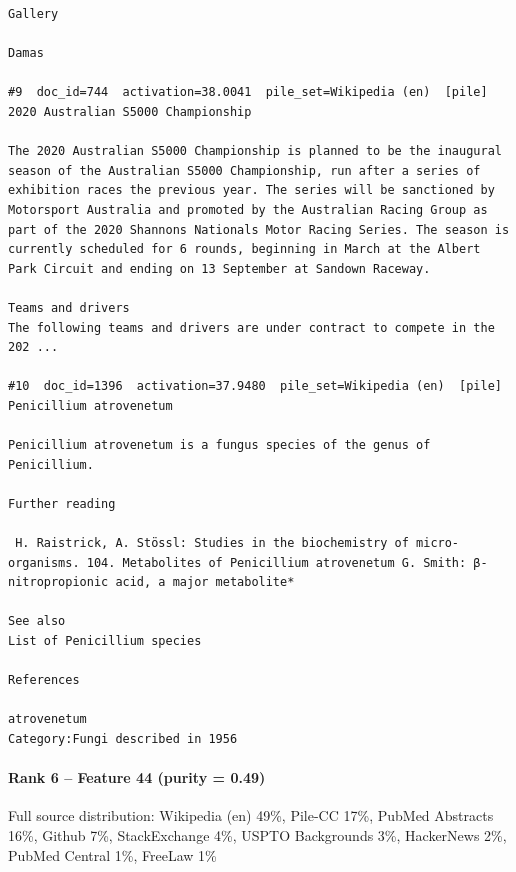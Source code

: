 \begin{verbatim}
Gallery

Damas

#9  doc_id=744  activation=38.0041  pile_set=Wikipedia (en)  [pile]
2020 Australian S5000 Championship

The 2020 Australian S5000 Championship is planned to be the inaugural season of the Australian S5000 Championship, run after a series of exhibition races the previous year. The series will be sanctioned by Motorsport Australia and promoted by the Australian Racing Group as part of the 2020 Shannons Nationals Motor Racing Series. The season is currently scheduled for 6 rounds, beginning in March at the Albert Park Circuit and ending on 13 September at Sandown Raceway.

Teams and drivers 
The following teams and drivers are under contract to compete in the 202 ...

#10  doc_id=1396  activation=37.9480  pile_set=Wikipedia (en)  [pile]
Penicillium atrovenetum

Penicillium atrovenetum is a fungus species of the genus of Penicillium.

Further reading

 H. Raistrick, A. Stössl: Studies in the biochemistry of micro-organisms. 104. Metabolites of Penicillium atrovenetum G. Smith: β-nitropropionic acid, a major metabolite*

See also
List of Penicillium species

References

atrovenetum
Category:Fungi described in 1956

\end{verbatim}

\paragraph*{Rank 6 -- Feature 44 (purity = 0.49)}

Full source distribution: Wikipedia (en) 49\%, Pile-CC 17\%, PubMed Abstracts 16\%, Github 7\%, StackExchange 4\%, USPTO Backgrounds 3\%, HackerNews 2\%, PubMed Central 1\%, FreeLaw 1\%

